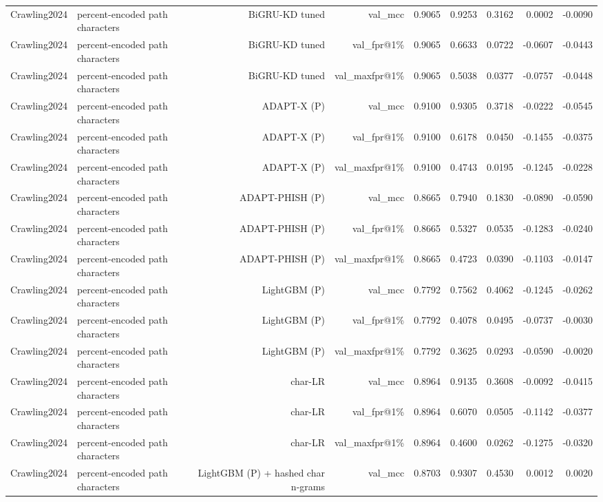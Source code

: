 \begin{table}[t]
\begin{tabular}{llrrrrrrr}
Crawling2024 & percent-encoded path characters & BiGRU-KD tuned & val\_mcc & 0.9065 & 0.9253 & 0.3162 & 0.0002 & -0.0090 \\
Crawling2024 & percent-encoded path characters & BiGRU-KD tuned & val\_fpr@1\% & 0.9065 & 0.6633 & 0.0722 & -0.0607 & -0.0443 \\
Crawling2024 & percent-encoded path characters & BiGRU-KD tuned & val\_maxfpr@1\% & 0.9065 & 0.5038 & 0.0377 & -0.0757 & -0.0448 \\
Crawling2024 & percent-encoded path characters & ADAPT-X (P) & val\_mcc & 0.9100 & 0.9305 & 0.3718 & -0.0222 & -0.0545 \\
Crawling2024 & percent-encoded path characters & ADAPT-X (P) & val\_fpr@1\% & 0.9100 & 0.6178 & 0.0450 & -0.1455 & -0.0375 \\
Crawling2024 & percent-encoded path characters & ADAPT-X (P) & val\_maxfpr@1\% & 0.9100 & 0.4743 & 0.0195 & -0.1245 & -0.0228 \\
Crawling2024 & percent-encoded path characters & ADAPT-PHISH (P) & val\_mcc & 0.8665 & 0.7940 & 0.1830 & -0.0890 & -0.0590 \\
Crawling2024 & percent-encoded path characters & ADAPT-PHISH (P) & val\_fpr@1\% & 0.8665 & 0.5327 & 0.0535 & -0.1283 & -0.0240 \\
Crawling2024 & percent-encoded path characters & ADAPT-PHISH (P) & val\_maxfpr@1\% & 0.8665 & 0.4723 & 0.0390 & -0.1103 & -0.0147 \\
Crawling2024 & percent-encoded path characters & LightGBM (P) & val\_mcc & 0.7792 & 0.7562 & 0.4062 & -0.1245 & -0.0262 \\
Crawling2024 & percent-encoded path characters & LightGBM (P) & val\_fpr@1\% & 0.7792 & 0.4078 & 0.0495 & -0.0737 & -0.0030 \\
Crawling2024 & percent-encoded path characters & LightGBM (P) & val\_maxfpr@1\% & 0.7792 & 0.3625 & 0.0293 & -0.0590 & -0.0020 \\
Crawling2024 & percent-encoded path characters & char-LR & val\_mcc & 0.8964 & 0.9135 & 0.3608 & -0.0092 & -0.0415 \\
Crawling2024 & percent-encoded path characters & char-LR & val\_fpr@1\% & 0.8964 & 0.6070 & 0.0505 & -0.1142 & -0.0377 \\
Crawling2024 & percent-encoded path characters & char-LR & val\_maxfpr@1\% & 0.8964 & 0.4600 & 0.0262 & -0.1275 & -0.0320 \\
Crawling2024 & percent-encoded path characters & LightGBM (P) + hashed char n-grams & val\_mcc & 0.8703 & 0.9307 & 0.4530 & 0.0012 & 0.0020 \\

\end{tabular}
\end{table}

